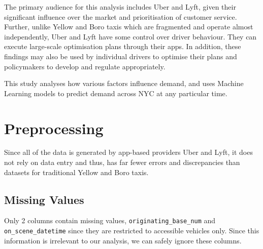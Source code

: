 \documentclass[11pt]{article}
\begin{document}
The primary audience for this analysis includes Uber and Lyft, given their significant influence over the market and prioritisation of customer service. Further, unlike Yellow and Boro taxis which are fragmented and operate almost independently, Uber and Lyft have some control over driver behaviour. They can execute large-scale optimisation plans through their apps. In addition, these findings may also be used by individual drivers to optimise their plans and policymakers to develop and regulate appropriately.

This study analyses how various factors influence demand, and uses Machine Learning models to predict demand across NYC at any particular time.

\section{Preprocessing}
Since all of the data is generated by app-based providers Uber and Lyft, it does not rely on data entry and thus, has far fewer errors and discrepancies than datasets for traditional Yellow and Boro taxis.

\subsection{Missing Values}
Only 2 columns contain missing values, \texttt{originating\_base\_num} and \texttt{on\_scene\_datetime} since they are restricted to accessible vehicles only. Since this information is irrelevant to our analysis, we can safely ignore these columns.
\end{document}
